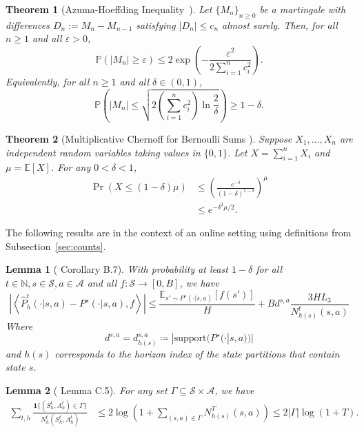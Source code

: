 \documentclass[twoside]{article}
\newtheorem{theorem}{Theorem}
\newtheorem{lemma}{Lemma}
\begin{document}
\begin{theorem}[Azuma-Hoeffding Inequality~\cite{hoeffding_probability_1963, azuma_weighted_1967}]
\label{thm:AH}
Let $\{M_n\}_{n\ge 0}$ be a martingale with differences $D_n := M_n - M_{n-1}$ satisfying
$|D_n|\le c_n$ almost surely.
Then, for all $n\ge 1$ and all $\varepsilon>0$,
\[
\mathbb{P}\left(|M_n|\ge \varepsilon\right)\le 2\exp\left(-\frac{\varepsilon^2}{2\sum_{i=1}^n c_i^2}\right).
\]
Equivalently, for all $n\ge 1$ and all $\delta\in(0,1)$,
\[
\mathbb{P}\left(|M_n|\le \sqrt{2\left(\sum_{i=1}^n c_i^2\right)\ln\frac{2}{\delta}}\right)\ge 1-\delta.
\]
\end{theorem}


\begin{theorem}[Multiplicative Chernoff for Bernoulli Sums \cite{chernoff_measure_1952}]
\label{thm:chernoff}
Suppose $X_1, \dots, X_n$ are independent random variables taking values in $\{0, 1\}$. Let $X = \sum_{i=1}^n X_i$ and $\mu = \mathbb{E}[X]$. For any $0 < \delta < 1$,
\begin{align*}
\Pr(X \leq (1-\delta)\mu) & \leq \left(\frac{e^{-\delta}}{(1-\delta)^{1-\delta}}\right)^\mu \\
    & \leq e^{-\delta^2 \mu/2}.
\end{align*}
\end{theorem}


The following results are in the context of an online setting using definitions from Subsection~\ref{sec:counts}.
\begin{lemma}[\cite{gupta_unpacking_2022} Corollary B.7]
    \label{lemma:borrowed}
With probability at least $1-\delta$ for all $t \in \mathbb{N}, s \in \mathcal{S}, a \in \mathcal{A}$ and all $f : \mathcal{S} \to [0,B]$, we have
\[
\left| 
    \left \langle \widehat{P}_h^{t}(\cdot|s,a) - P^\star(\cdot|s,a) , f \right \rangle
\right|
\le 
\frac{\mathbb{E}_{s' \sim P^\star(\cdot|s,a)}\left[f(s')\right]}{H}
+ 
B d^{s,a}
    \frac{3   H L_3}
    {N_{h(s)}^t(s,a)}
\]
Where 
\[d^{s,a} = d_{h(s)}^{s,a} \coloneqq |\mathrm{support}(P^\star(\cdot|s,a))|\] 
and $h(s)$ corresponds to the horizon index of the state partitions that contain state $s$.
\end{lemma}

\begin{lemma}[\cite{gupta_unpacking_2022} Lemma C.5]
For any set \( \Gamma \subseteq \mathcal{S}\times\mathcal{A} \), we have
\begin{align}
    \sum_{t,h}\frac{\mathbf{1}\{(S_h^t,A_h^t)\in\Gamma \}}{N_h^t(S_h^t,A_h^t)}
    &\le 2 \log \left ( 1 + \sum_{(s,a)\in\Gamma }N^{T}_{h(s)}(s,a)\right )\le  2|\Gamma |\log(1+T).
    \label{eq:U_sum_N_inv}
\end{align}
\end{lemma}
\end{document}
